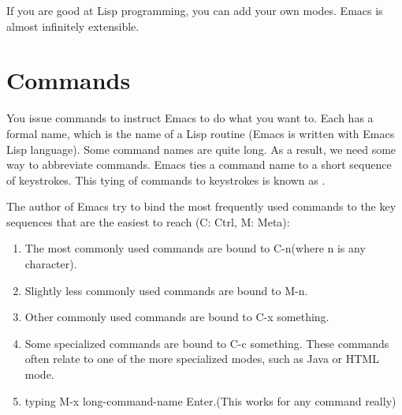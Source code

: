 If you are good at Lisp programming, you can add your own modes. Emacs is almost infinitely extensible.

\section{Commands}
You issue commands to instruct Emacs to do what you want to. Each  has a formal name, which is the name of a Lisp routine (Emacs is written with Emacs Lisp language). Some command names are quite long. As a result, we need some way to abbreviate commands. Emacs ties a command name to a short sequence of keystrokes. This tying of commands to keystrokes is known as .

\begin{tcolorbox}
  The author of Emacs try to bind the most frequently used commands to the key sequences that are the easiest to reach (C: Ctrl, M: Meta):
  \begin{enumerate}
  \item The most commonly used commands are bound to C-n(where n is any character).
  \item Slightly less commonly used commands are bound to M-n.
  \item Other commonly used commands are bound to C-x something.
  \item Some specialized commands are bound to C-c something. These commands often relate to one of the more specialized modes, such as Java or HTML mode.
  \item typing M-x long-command-name Enter.(This works for any command really)
  \end{enumerate}
\end{tcolorbox}


